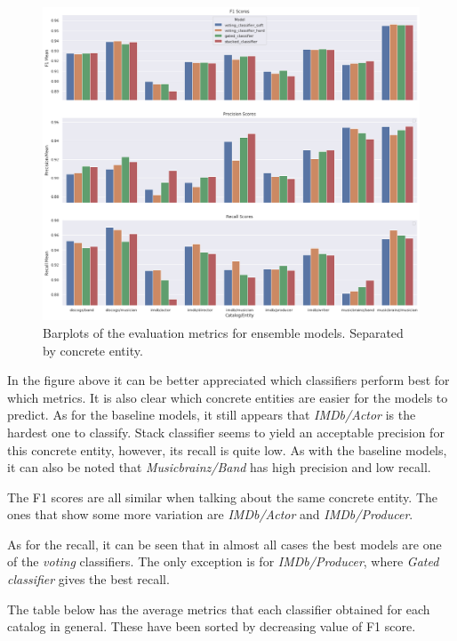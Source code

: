 \documentclass[epsfig,a4paper,11pt,titlepage,twoside,openany]{book}
\begin{document}
\begin{figure}[H]
  \centering \includegraphics[width=\textwidth]{ensemble_evluation_main_metrics_barplot_bigger} 
  \caption{Barplots of the evaluation metrics for ensemble models. Separated by concrete entity.}
  \label{fig:ensmble-evaluation-barplots}
\end{figure}


In the figure above it can be better appreciated which classifiers perform best for which metrics. It is also clear which concrete entities are easier for the models to predict. As for the baseline models, it still appears that \textit{IMDb/Actor} is the hardest one to classify. Stack classifier seems to yield an acceptable precision for this concrete entity, however, its recall is quite low. As with the baseline models, it can also be noted that \textit{Musicbrainz/Band} has high precision and low recall.  

The F1 scores are all similar when talking about the same concrete entity. The ones that show some more variation are \textit{IMDb/Actor} and \textit{IMDb/Producer}. 

As for the recall, it can be seen that in almost all cases the best models are one of the \textit{voting} classifiers. The only exception is for \textit{IMDb/Producer}, where \textit{Gated classifier} gives the best recall.

The table below has the average metrics that each classifier obtained for each catalog in general. These have been sorted by decreasing value of F1 score.
\end{document}
